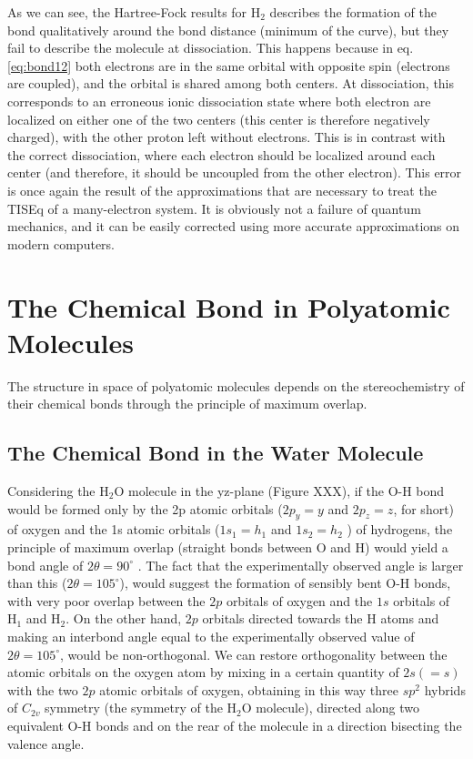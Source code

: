 \documentclass[
  9pt,
]{extbook}
\theoremstyle{definition}
\theoremstyle{definition}
\theoremstyle{definition}
\theoremstyle{remark}
\begin{document}
As we can see, the Hartree-Fock results for \(\mathrm{H}_2\) describes the formation of the bond qualitatively around the bond distance (minimum of the curve), but they fail to describe the molecule at dissociation. This happens because in eq. \eqref{eq:bond12} both electrons are in the same orbital with opposite spin (electrons are coupled), and the orbital is shared among both centers. At dissociation, this corresponds to an erroneous ionic dissociation state where both electron are localized on either one of the two centers (this center is therefore negatively charged), with the other proton left without electrons. This is in contrast with the correct dissociation, where each electron should be localized around each center (and therefore, it should be uncoupled from the other electron). This error is once again the result of the approximations that are necessary to treat the TISEq of a many-electron system. It is obviously not a failure of quantum mechanics, and it can be easily corrected using more accurate approximations on modern computers.

\hypertarget{Poly}{%
\chapter{The Chemical Bond in Polyatomic Molecules}\label{Poly}}

The structure in space of polyatomic molecules depends on the stereochemistry of their chemical bonds through the principle of maximum overlap.

\hypertarget{the-chemical-bond-in-the-water-molecule}{%
\section{The Chemical Bond in the Water Molecule}\label{the-chemical-bond-in-the-water-molecule}}

Considering the \(\mathrm{H}_2\mathrm{O}\) molecule in the yz-plane (Figure XXX), if the O-H bond would be formed only by the 2p atomic orbitals (\(2p_y = y\) and \(2p_z = z\), for short) of oxygen and the 1s atomic orbitals (\(1s_1 = h_1\) and \(1s_2 = h_2\) ) of hydrogens, the principle of maximum overlap (straight bonds between O and H) would yield a bond angle of \(2\theta = 90^{\circ}\) . The fact that the experimentally observed angle is larger than this (\(2\theta = 105^{\circ}\)), would suggest the formation of sensibly bent O-H bonds, with very poor overlap between the \(2p\) orbitals of oxygen and the \(1s\) orbitals of \(\mathrm{H}_1\) and \(\mathrm{H}_2\). On the other hand, \(2p\) orbitals directed towards the H atoms and making an interbond angle equal to the experimentally observed value of \(2\theta = 105^{\circ}\), would be non-orthogonal. We can restore orthogonality between the atomic orbitals on the oxygen atom by mixing in a certain quantity of \(2s (= s)\) with the two \(2p\) atomic orbitals of oxygen, obtaining in this way three \(sp^2\) hybrids of \(C_{2v}\) symmetry (the symmetry of the \(\mathrm{H}_2\mathrm{O}\) molecule), directed along two equivalent O-H bonds and on the rear of the molecule in a direction bisecting the valence angle.
\end{document}
